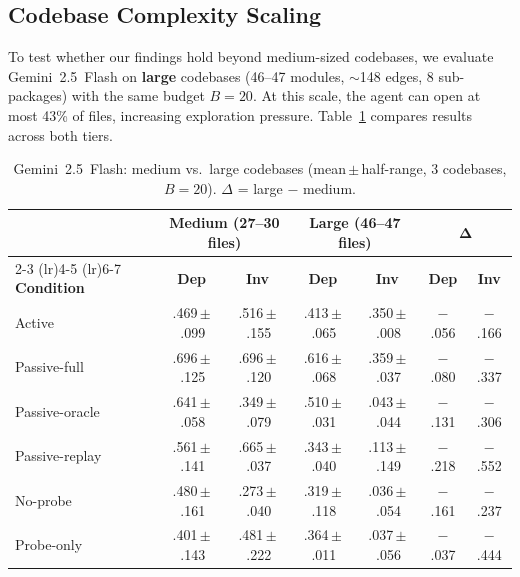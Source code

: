 \documentclass{article}
\newcommand{\pms}[1]{\,{\scriptsize$\pm$\,#1}}
\begin{document}
\subsection{Codebase Complexity Scaling}
\label{sec:scaling}

To test whether our findings hold beyond medium-sized codebases, we evaluate Gemini~2.5~Flash on \textbf{large} codebases (46--47 modules, $\sim$148 edges, 8 sub-packages) with the same budget $B{=}20$. At this scale, the agent can open at most 43\% of files, increasing exploration pressure. Table~\ref{tab:scaling} compares results across both tiers.

\begin{table}[h]
\centering
\caption{Gemini~2.5~Flash: medium vs.\ large codebases (mean\pms{half-range}, 3 codebases, $B{=}20$). $\Delta$ = large $-$ medium.}
\label{tab:scaling}
\begin{tabular}{@{}lcccccc@{}}
\toprule
 & \multicolumn{2}{c}{\textbf{Medium (27--30 files)}} & \multicolumn{2}{c}{\textbf{Large (46--47 files)}} & \multicolumn{2}{c}{$\boldsymbol{\Delta}$} \\
\cmidrule(lr){2-3} \cmidrule(lr){4-5} \cmidrule(lr){6-7}
\textbf{Condition} & \textbf{Dep} & \textbf{Inv} & \textbf{Dep} & \textbf{Inv} & \textbf{Dep} & \textbf{Inv} \\
\midrule
Active          & .469\pms{.099} & .516\pms{.155} & .413\pms{.065} & .350\pms{.008} & $-$.056 & $-$.166 \\
Passive-full    & .696\pms{.125} & .696\pms{.120} & .616\pms{.068} & .359\pms{.037} & $-$.080 & $-$.337 \\
Passive-oracle  & .641\pms{.058} & .349\pms{.079} & .510\pms{.031} & .043\pms{.044} & $-$.131 & $-$.306 \\
Passive-replay  & .561\pms{.141} & .665\pms{.037} & .343\pms{.040} & .113\pms{.149} & $-$.218 & $-$.552 \\
\midrule
No-probe        & .480\pms{.161} & .273\pms{.040} & .319\pms{.118} & .036\pms{.054} & $-$.161 & $-$.237 \\
Probe-only      & .401\pms{.143} & .481\pms{.222} & .364\pms{.011} & .037\pms{.056} & $-$.037 & $-$.444 \\
\bottomrule
\end{tabular}
\end{table}
\end{document}
